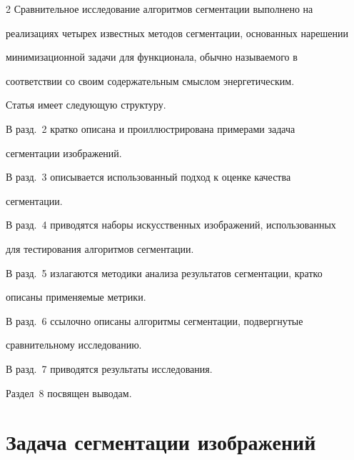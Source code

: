 \begin{multicols}{2}
  Сравнительное исследование алгоритмов сегментации выполнено на 


реализациях четырех известных методов сегментации, основанных на\linebreak решении 


минимизационной задачи для функционала, обычно называемого в 


соответствии со своим содержательным смыслом энергетическим.


  


  Статья имеет следующую структуру.


  


  В разд.~2 кратко описана и проиллюстрирована примерами задача 


сегментации изображений.


  


  В разд.~3 описывается использованный подход к оценке качества 


сегментации.


  


  В разд.~4 приводятся наборы искусственных изоб\-ра\-же\-ний, использованных 


для тестирования алгоритмов сегментации.


  


  В разд.~5 излагаются методики анализа результатов сегментации, кратко 


описаны применяемые метрики.


  


  В разд.~6 ссылочно описаны алгоритмы сегментации, подвергнутые 


сравнительному исследованию.


  


  В разд.~7 приводятся результаты исследования.


  


  Раздел~8 посвящен выводам.


  


  \vspace*{-6pt}


  


  \section{Задача сегментации изображений}



\end{multicols}
